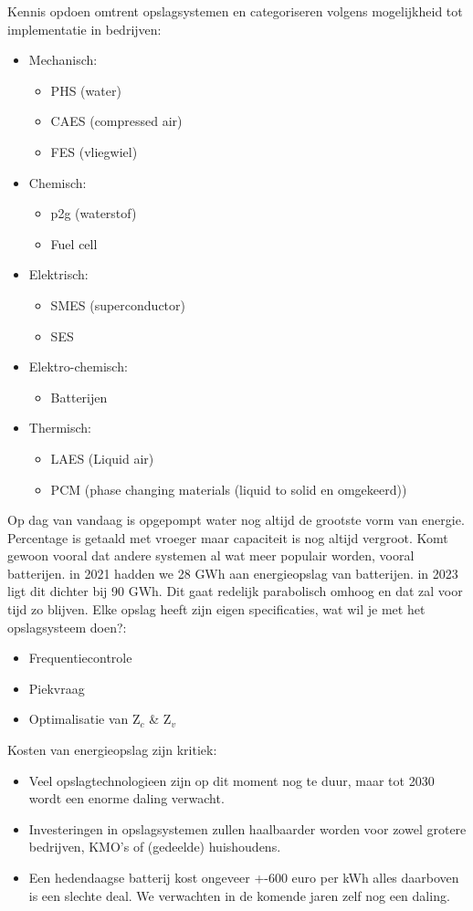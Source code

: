 \documentclass[12pt]{article}
\begin{document}
Kennis opdoen omtrent opslagsystemen en categoriseren volgens mogelijkheid tot implementatie in bedrijven:\begin{itemize}
    \item Mechanisch:\begin{itemize}
        \item PHS (water)
        \item CAES (compressed air)
        \item FES (vliegwiel)
    \end{itemize}
    \item Chemisch:\begin{itemize}
        \item p2g (waterstof)
        \item Fuel cell
    \end{itemize}
    \item Elektrisch:\begin{itemize}
        \item SMES (superconductor)
        \item SES 
    \end{itemize}
    \item Elektro-chemisch:\begin{itemize}
        \item Batterijen
    \end{itemize}
    \item Thermisch:\begin{itemize}
        \item LAES (Liquid air)
        \item PCM (phase changing materials (liquid to solid en omgekeerd))
    \end{itemize}
\end{itemize}
Op dag van vandaag is opgepompt water nog altijd de grootste vorm van energie. Percentage is getaald met vroeger maar capaciteit is nog altijd vergroot. Komt gewoon vooral dat andere systemen al wat meer populair worden, vooral batterijen. in 2021 hadden we 28 GWh aan energieopslag van batterijen. in 2023 ligt dit dichter bij 90 GWh. Dit gaat redelijk parabolisch omhoog en dat zal voor tijd zo blijven.
Elke opslag heeft zijn eigen specificaties, wat wil je met het opslagsysteem doen?:\begin{itemize}
    \item Frequentiecontrole 
    \item Piekvraag 
    \item Optimalisatie van Z$_c$ \& Z$_v$
\end{itemize}
Kosten van energieopslag zijn kritiek:\begin{itemize}
    \item Veel opslagtechnologieen zijn op dit moment nog te duur, maar tot 2030 wordt een enorme daling verwacht.
    \item Investeringen in opslagsystemen zullen haalbaarder worden voor zowel grotere bedrijven, KMO's of (gedeelde) huishoudens.
    \item Een hedendaagse batterij kost ongeveer +-600 euro per kWh alles daarboven is een slechte deal. We verwachten in de komende jaren zelf nog een daling.
\end{itemize}
\end{document}
